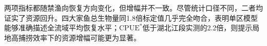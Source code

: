 两项指标都随禁渔向恢复方向变化，但增幅并不一致。尽管统计口径不同，二者均证实了资源回升。四大家鱼总生物量同1.8倍标定值几乎完全吻合，表明单区模型能够准确描述全流域平均恢复水平；$\mathrm{CPUE}^*$低于湖北江段实测的2.2倍，则提示局地高捕捞效率下的资源增幅可能更为显著。

